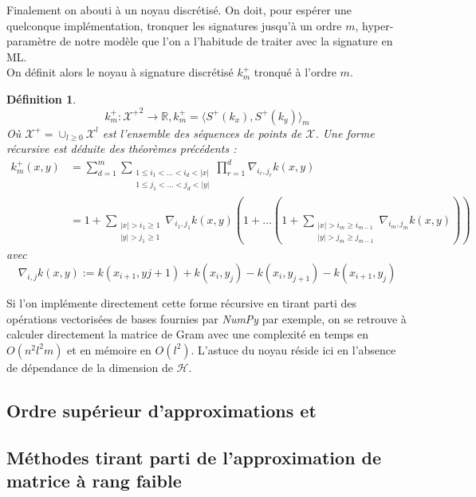 \documentclass[10pt,a4paper]{article}
\newtheorem{definition}{Définition}
\begin{document}
Finalement on abouti à un noyau discrétisé. On doit, pour espérer une quelconque implémentation, tronquer les signatures jusqu'à un ordre $m$, hyper-paramètre de notre modèle que l'on a l'habitude de traiter avec la signature en ML.\\
On définit alors le noyau à signature discrétisé $k^+_m$ tronqué à l'ordre $m$.
\begin{definition}

\[ k^+_m : {\mathcal{X}^+}^2 \rightarrow \mathbb{R}, k^+_m = \langle S^+ (k_x ), S^+ (k_y ) \rangle_m
\]
Où $\mathcal{X^+} = \cup_{l\geq 0} \mathcal{X}^l $ est l'ensemble des séquences de points de $\mathcal{X}$.
Une forme récursive est déduite des théorèmes précédents :
\begin{align*}
k^+_m(x,y) &= \sum_{d=1}^m \sum_{\substack{1\leq i_1 < \ldots < i_d < |x| \\ 1\leq j_1 < \ldots < j_d < |y| }} \prod_{r=1}^d \nabla_{i_r , j_r}k(x, y)\\
&=1 + \sum_{\substack{|x| > i_1 \geq 1 \\ |y| > j_1 \geq 1 }} \nabla_{i_1, j_1} k(x,y) \left( 1 + \ldots \left(1 + \sum_{\substack{|x| > i_m \geq i_{m-1} \\ |y| > j_m \geq j_{m-1} }} \nabla_{i_m, j_m} k(x,y) \right) \right)
\end{align*} 
avec \[ \nabla_{i,j} k(x,y) := k(x_{i+1} , y{j+1} ) + k(x_i , y_j ) - k(x_i , y_{j+1} ) - k(x_{i+1} , y_j ) \]


\end{definition}


Si l'on implémente directement cette forme récursive en tirant parti des opérations vectorisées de bases fournies par \textit{NumPy} par exemple, on se retrouve à calculer directement la matrice de Gram avec une complexité en temps en $O(n^2  l^2 m)$ et en mémoire en $O(l^2)$. L'astuce du noyau réside ici en l'absence de dépendance de la dimension de $\mathcal{H}$. \\

\subsection{Ordre supérieur d'approximations et }

\subsection{Méthodes tirant parti de l'approximation de matrice à rang faible}
\end{document}
